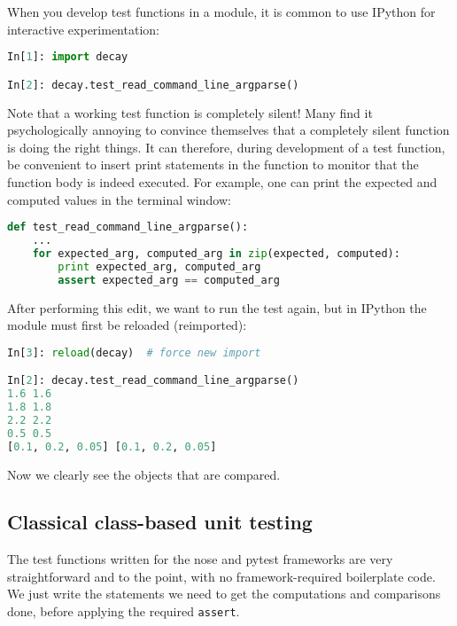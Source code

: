 \documentclass[graybox,sectrefs,envcountresetchap,open=right,final]{svmonodo}
\newenvironment{warning_mdfboxadmon}[1][]{
\begin{warning_mdfboxmdframed}[frametitle=#1]
}
{
\end{warning_mdfboxmdframed}
}
\begin{document}
\begin{warning_mdfboxadmon}
When you develop test functions in a module, it is common to use IPython
for interactive experimentation:

\begin{lstlisting}[language=Python,style=blue1_bluegreen]
In[1]: import decay

In[2]: decay.test_read_command_line_argparse()
\end{lstlisting}

Note that a working test function is completely silent! Many
find it psychologically annoying to convince themselves that a
completely silent function is doing the right things. It can therefore,
during development of a test function, be convenient to insert
print statements in the function to monitor that the function body
is indeed executed. For example, one can print the expected and
computed values in the terminal window:

\begin{lstlisting}[language=Python,style=blue1_bluegreen]
def test_read_command_line_argparse():
    ...
    for expected_arg, computed_arg in zip(expected, computed):
        print expected_arg, computed_arg
        assert expected_arg == computed_arg
\end{lstlisting}
After performing this edit, we want to run the test again, but
in IPython the module must first be reloaded (reimported):

\begin{lstlisting}[language=Python,style=blue1_bluegreen]
In[3]: reload(decay)  # force new import

In[2]: decay.test_read_command_line_argparse()
1.6 1.6
1.8 1.8
2.2 2.2
0.5 0.5
[0.1, 0.2, 0.05] [0.1, 0.2, 0.05]
\end{lstlisting}
Now we clearly see the objects that are compared.
\end{warning_mdfboxadmon}





\subsection{Classical class-based unit testing}
\label{softeng1:basic:unittest}


The test functions written for the nose and pytest frameworks are
very straightforward and to the point, with no framework-required boilerplate
code. We just write the statements we need to get the computations and
comparisons done, before applying the required \texttt{assert}.
\end{document}
